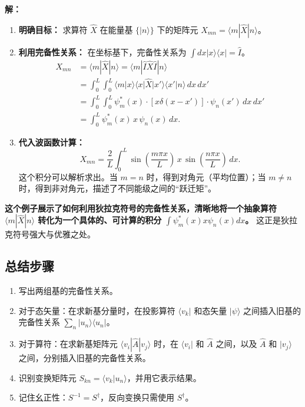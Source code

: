 \textbf{解：}
\begin{enumerate}
	\item \textbf{明确目标：} 求算符 $\hat{X}$ 在能量基 $\{|n\rangle\}$ 下的矩阵元 $X_{mn} = \langle m | \hat{X} | n \rangle$。
	\item \textbf{利用完备性关系：} 在坐标基下，完备性关系为 $\int dx |x\rangle\langle x| = \hat{I}$。
	\begin{align*}
		X_{mn} &= \langle m | \hat{X} | n \rangle 
		= \langle m | \hat{I} \hat{X} \hat{I} | n \rangle \\
		&= \int_0^L \int_0^L 
		\langle m | x \rangle 
		\langle x | \hat{X} | x' \rangle 
		\langle x' | n \rangle \, dx\, dx' \\
		&= \int_0^L \int_0^L 
		\psi_m^*(x) \cdot \left[ x \delta(x - x') \right] \cdot \psi_n(x') \, dx\, dx' \\
		&= \int_0^L \psi_m^*(x) \, x \, \psi_n(x) \, dx.
	\end{align*}
	\item \textbf{代入波函数计算：}
	\[
	X_{mn} = \frac{2}{L} \int_0^L 
	\sin\left( \frac{m\pi x}{L} \right) \, x \, 
	\sin\left( \frac{n\pi x}{L} \right) \, dx.
	\]
	这个积分可以解析求出。当 $m=n$ 时，得到对角元（平均位置）；当 $m \ne n$ 时，得到非对角元，描述了不同能级之间的“跃迁矩”。
\end{enumerate}

\textbf{这个例子展示了如何利用狄拉克符号的完备性关系，清晰地将一个抽象算符 $\langle m | \hat{X} | n \rangle$ 转化为一个具体的、可计算的积分 $\int \psi_m^*(x) x \psi_n(x) dx$。} 这正是狄拉克符号强大与优雅之处。

\subsection{总结步骤}
\begin{enumerate}
	\item 写出两组基的完备性关系。
	\item 对于态矢量：在求新基分量时，在投影算符 $\langle v_k|$ 和态矢量 $|\psi\rangle$ 之间插入旧基的完备性关系 $\sum_n |u_n\rangle\langle u_n|$。
	\item 对于算符：在求新基矩阵元 $\langle v_i | \hat{A} | v_j \rangle$ 时，在 $\langle v_i|$ 和 $\hat{A}$ 之间，以及 $\hat{A}$ 和 $|v_j\rangle$ 之间，分别插入旧基的完备性关系。
	\item 识别变换矩阵元 $S_{kn} = \langle v_k | u_n \rangle$，并用它表示结果。
	\item 记住幺正性：$S^{-1} = S^\dagger$，反向变换只需使用 $S^\dagger$。
\end{enumerate}

